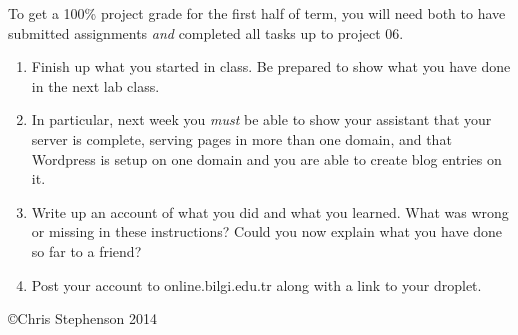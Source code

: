 \documentclass[12pt, a4paper]{article}
\begin{document}
To get a 100\% project grade for the first half of term, you will need both to have submitted assignments \emph{and} completed all tasks up to project 06. 

\begin{enumerate}
\item Finish up what you started in class. Be prepared to show what you have done in the next lab class. 
\item In particular, next week you \emph{must} be able to show your assistant that your server is complete, serving pages in more than one domain, and that Wordpress is setup on one domain and you are able to create blog entries on it. 
\item Write up an account of what you did and what you learned. What was wrong or missing in these instructions? Could you now explain what you have done so far to a friend?
\item Post your account to online.bilgi.edu.tr along with a link to your droplet.

\end{enumerate}

\copyright Chris Stephenson 2014
\end{document}
